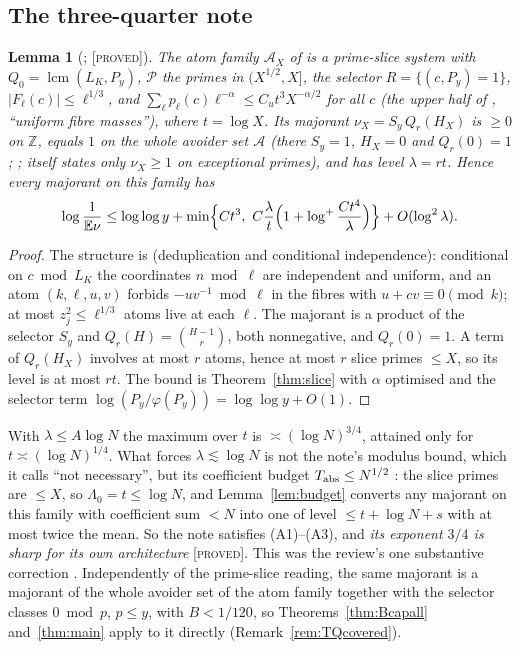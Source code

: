 \documentclass[10pt,reqno]{amsart}
\newtheorem{lemma}[theorem]{Lemma}
\theoremstyle{definition}
\theoremstyle{remark}
\newcommand{\A}{\mathcal A}
\newcommand{\cP}{\mathcal P}
\newcommand{\E}{\mathbb E}
\newcommand{\Z}{\mathbb Z}
\newcommand{\lcm}{\operatorname{lcm}}
\newcommand{\lab}[1]{\textup{[\textsc{#1}]}}
\begin{document}
\subsection{The three-quarter note}
\begin{lemma}[{\cite[Lemma~4.1]{ET}}; \lab{proved}]\label{lem:TQinclass}
The atom family $\A_X$ of \cite[\S2]{TQ} is a prime-slice system with
$Q_0=\lcm(L_K,P_y)$, $\cP$ the primes in $(X^{1/2},X]$, the selector
$R=\{(c,P_y)=1\}$, $|F_\ell(c)|\leq\ell^{1/3}$, and
$\sum_\ell p_\ell(c)\ell^{-\alpha}\leq C_ut^3X^{-\alpha/2}$ for all $c$ (the
upper half of \cite[Cor.~4.3]{TQ}, ``uniform fibre masses''),
where $t=\log X$.  Its majorant $\nu_X=S_y\,Q_r(H_X)$ is $\geq0$ on $\Z$,
equals $1$ on the whole avoider set $\A$ (there $S_y=1$, $H_X=0$ and
$Q_r(0)=1$; \cite[item~3.1]{ETrev}; \cite[Thm~8.2]{TQ} itself states only
$\nu_X\geq1$ on exceptional primes), and has level $\lambda=rt$.  Hence every majorant on
this family has
\[
 \log\frac1{\E\nu}\leq\log\log y+\min\Bigl\{Ct^3,\ C\frac\lambda t\Bigl(1+\log^+\frac{Ct^4}\lambda\Bigr)\Bigr\}+O(\log^2\lambda).
\]
\end{lemma}
\begin{proof}
The structure is \cite[Lemma~2.2]{TQ} (deduplication and
conditional independence): conditional on $c\bmod L_K$ the coordinates
$n\bmod\ell$ are independent and uniform, and an atom $(k,\ell,u,v)$ forbids
$-uv^{-1}\bmod\ell$ in the fibres with $u+cv\equiv0\pmod k$; at most
$z_j^2\leq\ell^{1/3}$ atoms live at each $\ell$.  The majorant is a product of
the selector $S_y$ and $Q_r(H)=\binom{H-1}r$, both nonnegative, and $Q_r(0)=1$.
A term of $Q_r(H_X)$ involves at most $r$ atoms, hence at most $r$ slice
primes $\leq X$, so its level is at most $rt$.  The bound is
Theorem~\ref{thm:slice} with $\alpha$ optimised and the selector term
$\log(P_y/\varphi(P_y))=\log\log y+O(1)$.
\end{proof}
With $\lambda\leq A\log N$ the maximum over $t$ is $\asymp(\log N)^{3/4}$,
attained only for $t\asymp(\log N)^{1/4}$.  What forces $\lambda\lesssim\log
N$ is not the note's modulus bound, which it calls ``not necessary'', but
its coefficient budget $T_{\rm abs}\leq N^{1/2}$ \cite[proof of Thm~8.2]{TQ}:
the slice primes are $\leq X$, so $\Lambda_0=t\leq\log N$, and
Lemma~\ref{lem:budget} converts any majorant on this family with
coefficient sum $<N$ into one of level $\leq t+\log N+s$ with at most twice
the mean.  So the note satisfies (A1)--(A3), and \emph{its exponent $3/4$
is sharp for its own architecture} \lab{proved}.  This was the review's
one substantive correction \cite[item~3, SC1]{ETrev}.  Independently of
the prime-slice reading, the same majorant is a majorant of the whole
avoider set of the atom family together with the selector classes
$0\bmod p$, $p\leq y$, with $B<1/120$, so Theorems~\ref{thm:Bcapall}
and~\ref{thm:main} apply to it directly (Remark~\ref{rem:TQcovered}).
\end{document}
